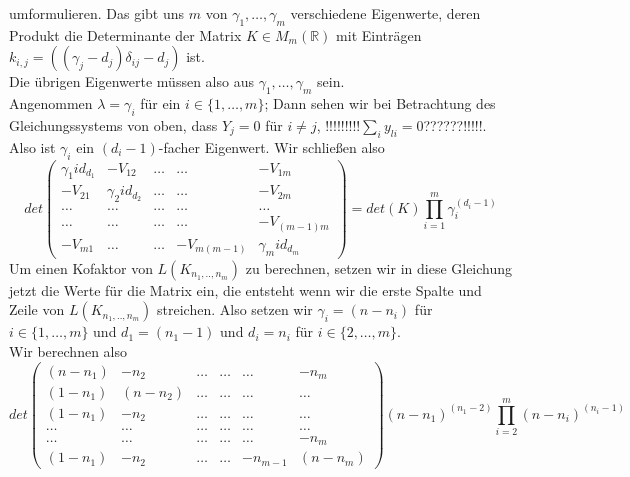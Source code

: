 umformulieren.
Das gibt uns $m$  von $\gamma_1,\ldots,\gamma_m$ verschiedene Eigenwerte, deren Produkt die Determinante der Matrix $K \in M_m(\mathbb{R})$ mit Einträgen $k_{i,j}=((\gamma_j-d_j)\delta_{ij}-d_j)$ ist.\\
Die übrigen Eigenwerte müssen also aus $\gamma_1,\ldots,\gamma_m$ sein.\\
Angenommen $\lambda=\gamma_i$ für ein $i\in\{1,\ldots,m\}$; Dann sehen wir bei Betrachtung des Gleichungssystems von oben, dass $Y_j=0$ für $i\neq j$, !!!!!!!!!$\sum_iy_{li}=0$??????!!!!!.
Also ist $\gamma_i$ ein $(d_i-1)$-facher Eigenwert.
Wir schließen also
\begin{equation}
{det
\begin{pmatrix}
 {\gamma_1}id_{d_1}&-V_{12}&\ldots&\ldots&-V_{1m}\\
 -V_{21}&{\gamma_2}id_{d_2}&\ldots&\ldots&-V_{2m}\\
 \ldots&\ldots&\ldots&\ldots&\ldots\\
  \ldots&\ldots&\ldots&\ldots&-V_{(m-1)m}\\
 -V_{m1}&\ldots&\ldots&-V_{m(m-1)}&{\gamma_m}id_{d_m}
\end{pmatrix}
}
={det(K)\prod_{i=1}^m \gamma_i^{(d_i -1)}}
\end{equation}
Um einen Kofaktor von $L(K_{n_1,..,n_m})$ zu berechnen, setzen wir in diese Gleichung jetzt die Werte für die Matrix ein, die entsteht wenn wir die erste Spalte und Zeile von $L(K_{n_1,..,n_m})$ streichen. Also setzen wir 
$\gamma_i=(n-n_i)$ für $i\in\{1,\ldots,m\}$ und
$d_1=(n_1 -1)$ und $d_i=n_i$ für $i\in\{2,\ldots,m\}$.\\
Wir berechnen also
\begin{equation}
\label{vmp_1}
det
\begin{pmatrix}
 (n-n_1)&-n_2&\ldots&\ldots&\ldots&-n_m\\
 (1-n_1)&(n-n_2)&\ldots&\ldots&\ldots&\ldots\\
 (1-n_1)&-n_2&\ldots&\ldots&\ldots&\ldots\\
 \ldots&\ldots&\ldots&\ldots&\ldots&\ldots\\
 \ldots&\ldots&\ldots&\ldots&\ldots&-n_m\\
 (1-n_1)&-n_2&\ldots&\ldots&-n_{m-1}&(n-n_m)
\end{pmatrix}
(n-n_1)^{(n_1 -2)}\prod_{i=2}^m (n-n_i)^{(n_i -1)}
\end{equation}

